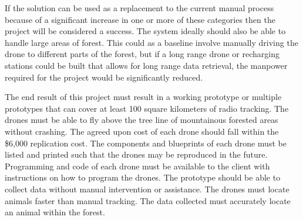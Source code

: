 \documentclass[onecolumn, draftclsnofoot,10pt, compsoc]{IEEEtran}
\begin{document}
If the solution can be used as a replacement to the current manual process because of a significant increase in one or more of these categories then the project will be considered a success. The system ideally should also be able to handle large areas of forest. This could as a baseline involve manually driving the drone to different parts of the forest, but if a long range drone or recharging stations could be built that allows for long range data retrieval, the manpower required for the project would be significantly reduced.

The end result of this project must result in a working prototype or multiple prototypes that can cover at least 100 square kilometers of radio tracking. The drones must be able to fly above the tree line of mountainous forested areas without crashing. The agreed upon cost of each drone should fall within the \$6,000 replication cost. The components and blueprints of each drone must be listed and printed such that the drones may be reproduced in the future. Programming and code of each drone must be available to the client with instructions on how to program the drones. The prototype should be able to collect data without manual intervention or assistance. The drones must locate animals faster than manual tracking. The data collected must accurately locate an animal within the forest. 
\end{document}
